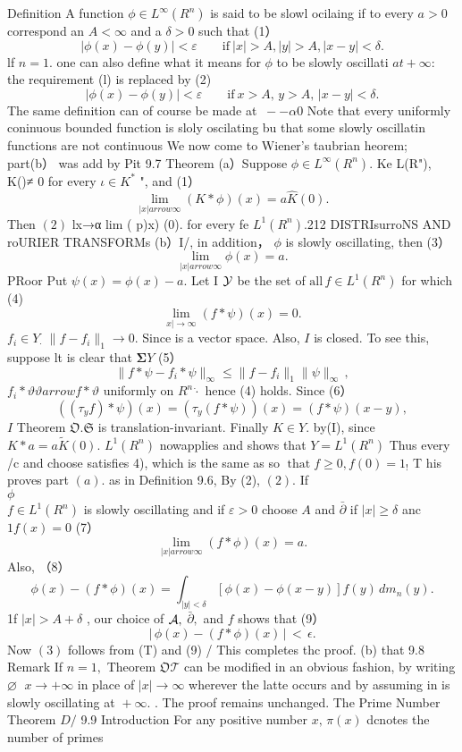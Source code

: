 Definition A function $\phi\in L^{\infty}(R^{n})$ is said to be slowl ocilaing if to every $\scriptstyle a>0$ correspond an $A<\infty$ and a $\delta>0$ such that (1） $$ |\phi(x)-\phi(y)|<\varepsilon\qquad{\mathrm{if~}}|x|>A,|y|>A,|x-y|<\delta. $$ lf $\scriptstyle n=1.$ one can also define what it means for $\phi$ to be slowly oscillati $a t+\infty{\mathrm{:}}$ the requirement (l) is replaced by (2) $$ \vert\phi(x)-\phi(y)\vert<\varepsilon\qquad\mathrm{if~}x>A,\,y>A,\,\vert x-y\vert<\delta. $$ The same definition can of course be made at $\textstyle{\ --\alpha0}$ Note that every uniformly coninuous bounded function is sloly oscilating bu that some slowly oscillatin functions are not continuous We now come to Wiener's taubrian heorem; part(b） was add by Pit 9.7 Theorem (a）Suppose $\phi\in L^{\infty}(R^{n}).$ Ke L(R"), K()≠ 0 for every $\iota\in K^{*}$ ", and (1） $$ \operatorname*{lim}_{|x| arrow\infty}(K*\phi)(x)=a\hat{K}(0). $$ Then $\left(2\right)$ lx→α lim ( p)x) (0). for every fe $L^{1}(R^{n}).$212 DISTRIsurroNS AND roURIER TRANSFORMs (b）I/, in addition， $\phi$ is slowly oscillating, then (3） $$ \operatorname*{lim}_{|x| arrow\infty}\phi(x)=a. $$ PRoor Put $\psi(x)=\phi(x)-a.$ Let I ${\cal{Y}}$ be the set of $\mathrm{all}\,f\in L^{1}(R^{n})$ for which (4) $$ \operatorname*{lim}_{x\mid\to\infty}(f*\psi)(x)=0. $$ $f_{i}\in Y_{\cdot}\;\|f-f_{i}\|_{1}\to0.$ Since is a vector space. Also, $\boldsymbol{\mathit{I}}$ is closed. To see this, suppose lt is clear that $\mathbf{\Sigma}Y$ (5） $$ \|f*\psi-f_{i}*\psi\|_{\infty}\leq\|f-f_{i}\|_{1}\|\psi\|_{\infty}\,, $$ $f_{i}*\vartheta\vartheta arrow f*\vartheta$ uniformly on $R^{n}{\dot{\cdot}}$ hence (4) holds. Since (6） $$ ((\tau_{y}f)*\psi)(x)=(\tau_{y}(f*\psi))(x)=(f*\psi)(x-y), $$ $\boldsymbol{\mathit{I}}$ Theorem $\mathfrak{O}.{\mathfrak{S}}$ is translation-invariant. Finally $K\in Y.$ by(I), since $K*a=a\tilde{K}(0).$ $L^{1}(R^{n})$ nowapplies and shows that $Y=L^{1}(R^{n})$ Thus every /c and choose satisfies 4), which is the same as so $\operatorname{that}f\geq0,f(0)=1_{!}$ T his proves part $(a).$ as in Definition 9.6, By (2), $(2).$ If $\phi~~~~~~~~~~~~~~~~~~~~~~~~~~~~~~~~~~~~~~~~~~~~~~~~~~~~~~~~~~~~~~~~~~~~~~~~~~~~~~~~~~~~~~~~~~~~~~~~~~~~~~~~~~~~~~~~~~~~~~~~~~~~~~~~~~~~~~~~~~~~~~~~~~~~~~~~~~~~~~~~~~~~~~~~~~~~~~~~~~~~~~~~~~~$ $f\in L^{1}(R^{n})$ is slowly oscillating and if $\scriptstyle{\varepsilon>0}$ choose $\scriptstyle A$ and $\bar{\partial}$ if $|x|\geq\delta$ anc $1f(x)=0$ (7） $$ \operatorname*{lim}_{|x| arrow\infty}(f*\phi)(x)=a. $$ Also, （8） $$ \phi(x)-(f*\phi)(x)=\int_{|y|<\delta}[\phi(x)-\phi(x-y)]f(y)\,d m_{n}(y). $$ 1f $\mid x\mid>A+\delta$ , our choice of ${\cal A},$ ${\bar{\partial}},$ and $\boldsymbol{\mathit{f}}$ shows that (9） $$ \left|\,\phi(x)-(f*\phi)(x)\,\right|\,<\,\epsilon. $$ Now $(3)$ follows from (T) and (9) / This completes thc proof. (b) that 9.8 Remark If $n=1,$ Theorem ${\mathfrak{O}}{\mathcal{T}}$ can be modified in an obvious fashion, by writing $\varnothing\;$ $x\to+\infty$ in place of $|x|\to\infty$ wherever the latte occurs and by assuming in is slowly oscillating at ${}+\infty.$ . The proof remains unchanged. The Prime Number Theorem $D\!\!\!\!/$ 9.9 Introduction For any positive number $x,\,\pi(x)$ dcnotes the number of primes 